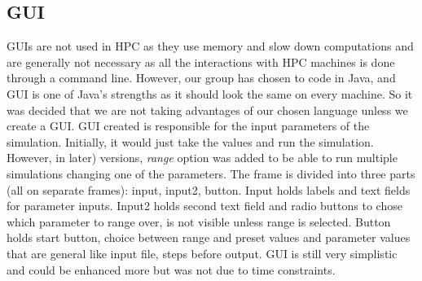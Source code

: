 \subsection{GUI}

GUIs are not used in HPC as they use memory and slow down computations and are generally not necessary as all the interactions with HPC machines is done through a command line.
However, our group has chosen to code in Java, and GUI is one of Java's strengths as it should look the same on every machine. So it was decided that we are not taking advantages of our chosen language unless we create a GUI. 
GUI created is responsible for the input parameters of the simulation. Initially, it would just take the values and run the simulation.
However, in later) versions, \emph{range} option was added to be able to run multiple simulations changing one of the parameters.
The frame is divided into three parts (all on separate frames): input, input2, button.
Input holds labels and text fields for parameter inputs. 
Input2 holds second text field and radio buttons to chose which parameter to range over, is not visible unless range is selected. 
Button holds start button, choice between range and preset values and parameter values that are general like input file, steps before output.
GUI is still very simplistic and could be enhanced more but was not due to time constraints.
